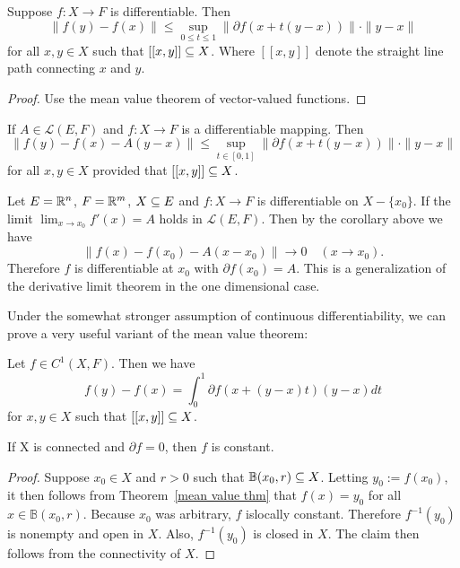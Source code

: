 \begin{theorem}\label{mean value thm}
Suppose $f:X \to F$ is differentiable. Then
\[\|f(y)-f(x)\|\leq\sup_{0\leq t\leq 1}\|\partial f(x+t(y-x))\|\cdot\|y-x\|\]
for all $x,y\in X$ such that $[[x, y]]\subseteq X$. Where $[[x,y]]$ denote the straight line path connecting $x$ and $y$.
\end{theorem}
\begin{proof}
   Use the mean value theorem of vector-valued functions.
\end{proof}
\begin{corollary}
If $A\in\mathcal{L}(E,F)$ and $f:X\to F$ is a differentiable mapping. Then
\[\|f(y)-f(x)-A(y-x)\|\leq\sup_{t\in[0,1]}\|\partial f(x+t(y-x))\|\cdot\|y-x\|\]
for all $x,y\in X$ provided that $[[x,y]]\subseteq X$.
\end{corollary}
\begin{example}
Let $E=\mathbb{R}^n$, $F=\mathbb{R}^m$, $X\subseteq E$ and $f:X\to F$ is differentiable on $X-\{x_0\}$. If the limit $\lim_{x\to x_0}f'(x)=A$ holds in $\mathcal{L}(E,F)$. Then by the corollary above we have
\[\|f(x)-f(x_0)-A(x-x_0)\|\to 0\quad (x\to x_0).\]
Therefore $f$ is differentiable at $x_0$ with $\partial f(x_0)=A$. This is a generalization of the derivative limit theorem in the one dimensional case.
\end{example}
Under the somewhat stronger assumption of continuous differentiability, we
can prove a very useful variant of the mean value theorem:
\begin{theorem}
Let $f\in C^1(X, F)$. Then we have
\[f(y)-f(x)=\int_{0}^{1}\partial f(x+(y-x)t)(y-x)dt\]
for $x,y\in X$ such that $[[x,y]]\subseteq X$.
\end{theorem}
\begin{corollary}
If X is connected and $\partial f=0$, then $f$ is constant.
\end{corollary}
\begin{proof}
Suppose $x_0\in X$ and $r>0$ such that $\mathbb{B}(x_0,r) \subseteq X$. Letting $y_0:=f(x_0)$, it then follows from Theorem~\ref{mean value thm} that $f(x)=y_0$ for all $x\in \mathbb{B}(x_0,r)$. Because $x_0$ was arbitrary, $f$ islocally constant. Therefore $f^{-1}(y_0)$ is nonempty and open in $X$. Also, $f^{-1}(y_0)$ is closed in $X$. The claim then follows from the connectivity of $X$.
\end{proof}
